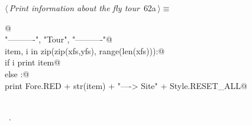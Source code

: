 \documentclass[11.5pt]{report}
\begin{document}
\vspace{-0.8cm} \newchunk
\begin{flushleft} \small\label{scrap88}\raggedright\small
{} $\langle\,${\itshape Print information about the fly tour}\nobreak\ {\footnotesize {62a}}$\,\rangle\equiv$
\vspace{-1ex}
\begin{list}{}{} \item
\mbox{}\verb@   @\\
\mbox{}\verb@print "\n----------", "\nFly Tour", "\n----------"@\\
\mbox{}\verb@for item, i in zip(zip(xfs,yfs), range(len(xfs))):@\\
\mbox{}\verb@   if i%2 == 0:@\\
\mbox{}\verb@       print item@\\
\mbox{}\verb@   else :@\\
\mbox{}\verb@       print Fore.RED + str(item) + "----> Site" +  Style.RESET_ALL@\\
\mbox{}\verb@@\\
\mbox{}\verb@@{\NWsep}
\end{list}
\vspace{-1.5ex}
\footnotesize
\begin{list}{}{\setlength{\itemsep}{-\parsep}\setlength{\itemindent}{-\leftmargin}}
\item \NWtxtMacroRefIn\ .

\item{}
\end{list}
\vspace{4ex}
\end{flushleft}
\end{document}

